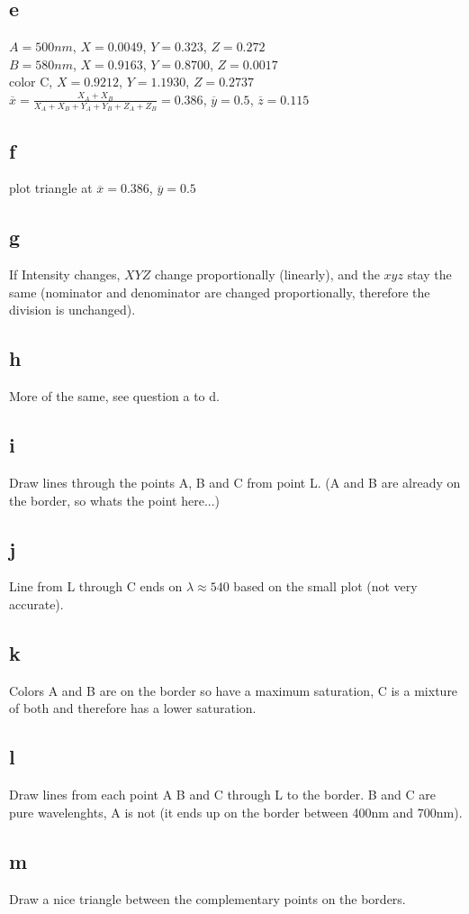\documentclass[a4paper,11pt]{article}
\newcommand{\ol}{\overline}
\begin{document}
	\subsection*{e}	
		$A=500nm$, $X=0.0049$, $Y=0.323$, $Z=0.272$\\
		$B=580nm$, $X=0.9163$, $Y=0.8700$, $Z=0.0017$\\ 
		color C, $X=0.9212$, $Y=1.1930$, $Z=0.2737$\\
		$\ol{x}=\frac{X_A+X_B}{X_A+X_B+Y_A+Y_B+Z_A+Z_B}=0.386$, $\ol{y}=0.5$, $\ol{z}=0.115$
	\subsection*{f}
		plot triangle at $\ol{x}=0.386$, $\ol{y}=0.5$
	\subsection*{g}
		If Intensity changes, $XYZ$ change proportionally (linearly), and the $xyz$ stay the same (nominator and denominator are changed proportionally, therefore the division is unchanged).
	\subsection*{h}	
		More of the same, see question a to d.
	\subsection*{i}	
		Draw lines through the points A, B and C from point L. (A and B are already on the border, so whats the point here...)
	\subsection*{j}
		Line from L through C ends on $\lambda \approx 540$ based on the small plot (not very accurate).
	\subsection*{k}
		Colors A and B are on the border so have a maximum saturation, C is a mixture of both and therefore has a lower saturation.
	\subsection*{l}
		Draw lines from each point A B and C through L to the border. B and C are pure wavelenghts, A is not (it ends up on the border between 400nm and 700nm).
	\subsection*{m}
		Draw a nice triangle between the complementary points on the borders. 
\end{document}
